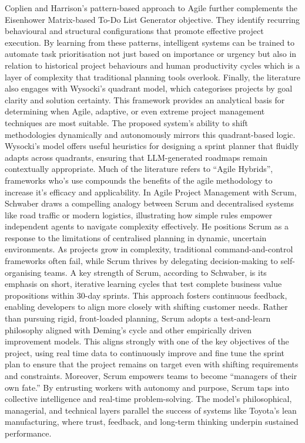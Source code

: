 \documentclass{report}
\begin{document}
Coplien and Harrison’s pattern-based approach to Agile further complements the Eisenhower Matrix-based To-Do List Generator objective. They identify recurring behavioural and structural configurations that promote effective project execution. By learning from these patterns, intelligent systems can be trained to automate task prioritisation not just based on importance or urgency but also in relation to historical project behaviours and human productivity cycles which is a layer of complexity that traditional planning tools overlook.
Finally, the literature also engages with Wysocki’s quadrant model, which categorises projects by goal clarity and solution certainty. This framework provides an analytical basis for determining when Agile, adaptive, or even extreme project management techniques are most suitable. The proposed system's ability to shift methodologies dynamically and autonomously mirrors this quadrant-based logic. Wysocki’s model offers useful heuristics for designing a sprint planner that fluidly adapts across quadrants, ensuring that LLM-generated roadmaps remain contextually appropriate.
Much of the literature refers to “Agile Hybrids”, frameworks who’s use compounds the benefits of the agile methodology to increase it’s efficacy and applicability. In Agile Project Management with Scrum, Schwaber \parencite{schwaberAgileProjectManagement2004} draws a compelling analogy between Scrum and decentralised systems like road traffic or modern logistics, illustrating how simple rules empower independent agents to navigate complexity effectively. He positions Scrum as a response to the limitations of centralised planning in dynamic, uncertain environments. As projects grow in complexity, traditional command-and-control frameworks often fail, while Scrum thrives by delegating decision-making to self-organising teams.
A key strength of Scrum, according to Schwaber, is its emphasis on short, iterative learning cycles that test complete business value propositions within 30-day sprints. This approach fosters continuous feedback, enabling developers to align more closely with shifting customer needs. Rather than pursuing rigid, front-loaded planning, Scrum adopts a test-and-learn philosophy aligned with Deming's cycle and other empirically driven improvement models. This aligns strongly with one of the key objectives of the project, using real time data to continuously improve and fine tune the sprint plan to ensure that the project remains on target even with shifting requirements and constraints.
Moreover, Scrum empowers teams to become “managers of their own fate.” By entrusting workers with autonomy and purpose, Scrum taps into collective intelligence and real-time problem-solving. The model’s philosophical, managerial, and technical layers parallel the success of systems like Toyota's lean manufacturing, where trust, feedback, and long-term thinking underpin sustained performance.
\end{document}

